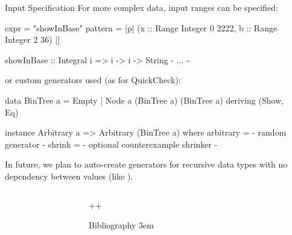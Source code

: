 \documentclass[final, 20pt, a0]{beamer}
\newlength{\sepwid}
\newlength{\marginwid}
\newlength{\onecolwid}
\newlength{\twocolwid}
\begin{document}
\begin{frame}[t,fragile]
\begin{columns}[t]
\begin{column}{\twocolwid}
\begin{block}{Input Specification}
  For more complex data, input ranges can be specified:
  \begin{hscode}
    expr = "showInBase"
    pattern = [p| (x :: Range Integer 0 2222, b :: Range Integer 2 36) |]

    showInBase :: Integral i => i -> i -> String
    {- ... -}
  \end{hscode}

  or custom generators used (as for QuickCheck):
  \begin{hscode}
    data BinTree a = Empty | Node a (BinTree a) (BinTree a)
                     deriving (Show, Eq)

    instance Arbitrary a => Arbitrary (BinTree a) where
        arbitrary = {- random generator -}
        shrink = {- optional counterexample shrinker -}
  \end{hscode}

  In future, we plan to auto-create generators for recursive data types with no dependency between values (like ).
\end{block}

\end{column} %

\begin{column}{\marginwid}\end{column} %

\end{columns}
\begin{columns}[t] %

\begin{column}{\marginwid}\end{column} %
\begin{column}{\onecolwid+\sepwid+\twocolwid}

\begin{block}{Bibliography}
    \emergencystretch 3em %
    \printbibliography[heading=none]
\end{block}

\end{column}

\begin{column}{\marginwid}\end{column} %

\end{columns}

\end{frame}
\end{document}
